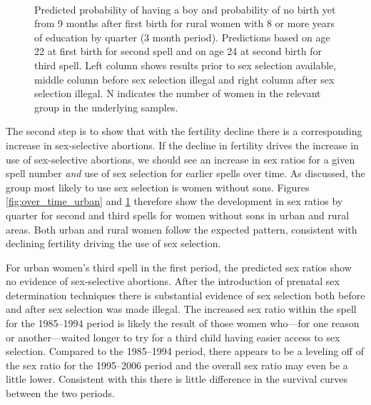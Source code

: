 \documentclass[12pt,letterpaper]{article}
\begin{document}
\begin{figure}[htpb]
{\begin{minipage}{0.31\textwidth}
        \captionsetup[subfigure]{labelformat=empty,position=top,captionskip=-1pt,farskip=-0.5pt}
        \\
        \captionsetup[subfigure]{labelformat=parens}
    \end{minipage}
}
\setcounter{subfigure}{3}
\caption{Predicted probability of having a boy and probability of
no birth yet from 9 months after first birth for rural
women with 8 or more years of education by quarter (3 month period). 
Predictions based on age 22 at first birth for second spell and on age 24 at second
birth for third spell.
Left column shows results prior to sex selection available, middle column before
sex selection illegal and right column after sex selection illegal.
N indicates the number of women in the relevant group in the underlying samples.
}
\label{fig:over_time_rural}
\end{figure}

The second step is to show that with the fertility decline there is a corresponding 
increase in sex-selective abortions.
If the decline in fertility drives the increase in use of sex-selective abortions, we 
should see an increase in sex ratios for a given spell number \emph{and} use of sex 
selection for earlier spells over time.
As discussed, the group most likely to use sex selection is women without sons.
Figures \ref{fig:over_time_urban} and \ref{fig:over_time_rural} therefore show the 
development in sex ratios by quarter for second and third spells for women without sons in 
urban and rural areas.
Both urban and rural women follow the expected pattern, consistent with declining 
fertility driving the use of sex selection.

For urban women's third spell in the first period, the predicted sex ratios  
show no evidence of sex-selective abortions.
After the introduction of prenatal sex determination techniques there is substantial
evidence of sex selection both before and after sex selection was made illegal.
The increased sex ratio within the spell for the 1985--1994 period is likely the
result of those women who---for one reason or another---waited longer to try for 
a third child having easier access to sex selection.
Compared to the 1985--1994 period, there appears to be a leveling off of the sex ratio 
for the 1995--2006 period and the overall sex ratio may even be a little lower.
Consistent with this there is little difference in the survival curves between
the two periods.
\end{document}
